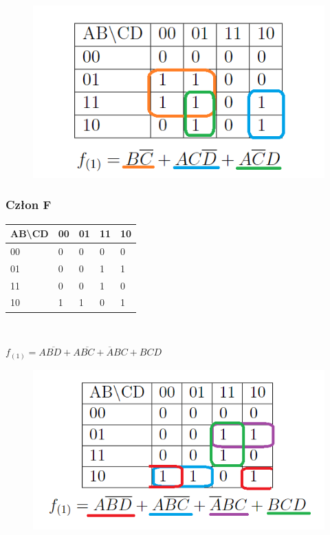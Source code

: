 \documentclass[a4paper]{article}
\begin{document}
\begin{figure}[H]
  \centering
  \includegraphics{tab_G.png}
 \end{figure}

\subsubsection{Człon F}
\begin{center}
\begin{tabular}{|l|l|l|l|l|}
  \hline
  AB\textbackslash{}CD & 00 & 01 & 11 & 10 \\ \hline
  00                   & 0  & 0  & 0  & 0  \\ \hline
  01                   & 0  & 0  & 1  & 1  \\ \hline
  11                   & 0  & 0  & 1  & 0  \\ \hline
  10                   & 1  & 1  & 0  & 1  \\ \hline
  \end{tabular}\\
\end{center}
\begin{center}
  $f_{(1)} = A\overline{BD} + A\overline{BC}+\overline{A}BC+BCD $
\end{center}

\begin{figure}[H]
  \centering
  \includegraphics{tab_F.png}
 \end{figure}
\end{document}
